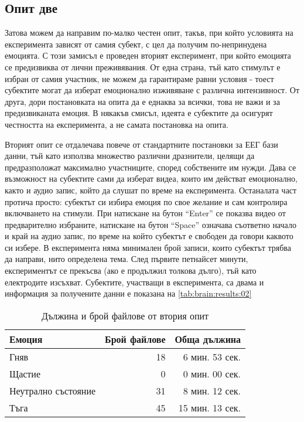 \documentclass[main.tex]{subfiles}
\begin{document}
\subsection{Опит две}
Затова можем да направим по-малко честен опит, такъв, при който условията на експеримента зависят от самия субект, с цел да получим по-непринудена емоцията. С този замисъл е проведен вторият експеримент, при който емоцията се предизвиква от лични преживявания. От една страна, тъй като стимулът е избран от самия участник, не можем да гарантираме равни условия - тоест субектите могат да изберат емоционално изживяване с различна интензивност. От друга, дори постановката на опита да е еднаква за всички, това не важи и за предизвиканата емоция. В някакъв смисъл, идеята е субектите да осигурят честността на експеримента, а не самата постановка на опита.

Вторият опит се отдалечава повече от стандартните постановки за ЕЕГ бази данни, тъй като използва множество различни дразнители, целящи да предразположат максимално участниците, според собствените им нужди. Дава се възможност на субектите сами да изберат видеа, които им действат емоционално, както и аудио запис, който да слушат по време на експеримента. Останалата част протича просто: субектът си избира емоция по свое желание и сам контролира включването на стимули. При натискане на бутон ``Enter'' се показва видео от предварително избраните, натискане на бутон ``Space'' означава съответно начало и край на аудио запис, по време на който субектът е свободен да говори каквото си избере. В експеримента няма минимален брой записи, които субектът трябва да направи, нито определена тема. След първите петнайсет минути, експериментът се прекъсва (ако е продължил толкова дълго), тъй като електродите изсъхват. Субектите, участващи в експеримента, са двама и информация за получените данни е показана на \autoref{tab:brain:results:02}

\begin{table}[h]
    \begin{center}
    \begin{tabular}{|l|r|r|} 
        \hline
        Емоция & Брой файлове & Обща дължина\\ 
        \hline
        Гняв & 18 & 6 мин. 53 сек.\\ 
        Щастие & 0 & 0 мин. 00 сек. \\ 
        Неутрално състояние & 31 & 8 мин. 12 сек. \\ 
        Тъга & 45 & 15 мин. 13 сек. \\ 
        \hline
    \end{tabular}
    \caption{Дължина и брой файлове от втория опит}
    \label{tab:brain:results:02}
    \end{center}
\end{table}
\end{document}

